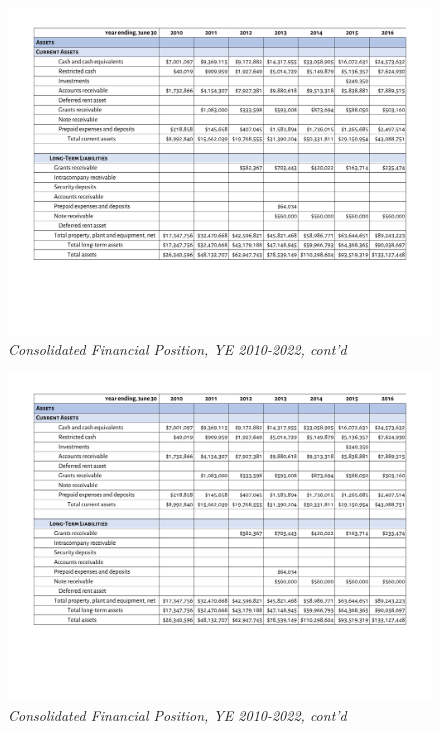 \begin{figure}
  \caption*{\textit{Consolidated Financial Position, YE 2010-2022, cont'd}}
 \label{fig:consolidated_financial_position_2010-2022} %
 \includegraphics[page=3,scale=0.8]{Consolidated_Financial_Position_Years_2010-2022} %
\end{figure}

\begin{figure}
  \caption*{\textit{Consolidated Financial Position, YE 2010-2022, cont'd}}
 \label{fig:consolidated_financial_position_2010-2022} %
 \includegraphics[page=4,scale=0.8]{Consolidated_Financial_Position_Years_2010-2022} %
\end{figure}

